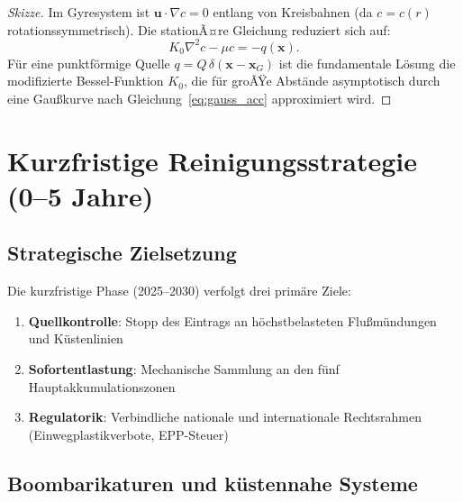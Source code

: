 ﻿\documentclass[12pt,a4paper]{article}
\theoremstyle{definition}
\theoremstyle{remark}
\begin{document}
\begin{proof}[Skizze]
Im Gyresystem ist $\mathbf{u} \cdot \nabla c = 0$ entlang von Kreisbahnen
(da $c = c(r)$ rotationssymmetrisch). Die stationÃ¤re Gleichung reduziert sich auf:
\begin{equation}
  K_0 \nabla^2 c - \mu c = -q(\mathbf{x}).
\end{equation}
F\"ur eine punktf\"ormige Quelle $q = Q\,\delta(\mathbf{x} - \mathbf{x}_G)$
ist die fundamentale L\"osung die modifizierte Bessel-Funktion $K_0$, die f\"ur
groÃŸe Abst\"ande asymptotisch durch eine Gau\ss{}kurve nach Gleichung~\eqref{eq:gauss_acc}
approximiert wird.
\end{proof}

\section{Kurzfristige Reinigungsstrategie (0--5 Jahre)}
\label{sec:kurzfristig}

\subsection{Strategische Zielsetzung}

Die kurzfristige Phase (2025--2030) verfolgt drei prim\"are Ziele:
\begin{enumerate}
  \item \textbf{Quellkontrolle}: Stopp des Eintrags an h\"ochstbelasteten
        Flu\ss{}m\"undungen und K\"ustenlinien
  \item \textbf{Sofortentlastung}: Mechanische Sammlung an den f\"unf
        Hauptakkumulationszonen
  \item \textbf{Regulatorik}: Verbindliche nationale und internationale
        Rechtsrahmen (Einwegplastikverbote, EPP-Steuer)
\end{enumerate}

\subsection{Boombarikaturen und k\"ustennahe Systeme}
\end{document}
